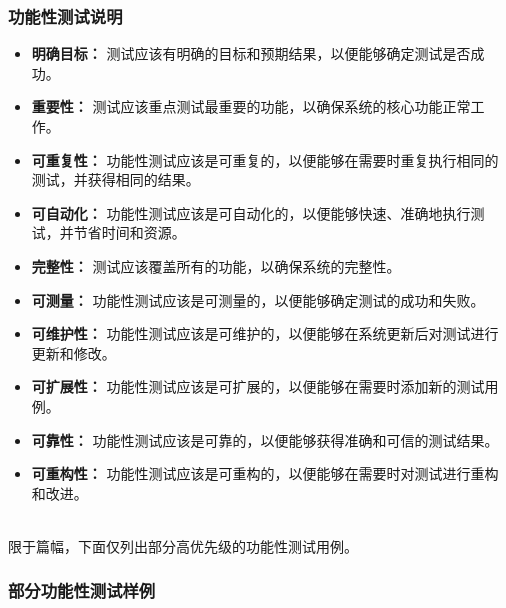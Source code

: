 \subsubsection{功能性测试说明}
\begin{itemize}[itemsep=2pt,topsep=0pt,parsep=4pt,itemindent=1em]
 \item \textbf{明确目标：} 测试应该有明确的目标和预期结果，以便能够确定测试是否成功。

\item \textbf{重要性：} 测试应该重点测试最重要的功能，以确保系统的核心功能正常工作。

\item \textbf{可重复性：} 功能性测试应该是可重复的，以便能够在需要时重复执行相同的测试，并获得相同的结果。

\item \textbf{可自动化：} 功能性测试应该是可自动化的，以便能够快速、准确地执行测试，并节省时间和资源。

\item \textbf{完整性：} 测试应该覆盖所有的功能，以确保系统的完整性。

\item \textbf{可测量：} 功能性测试应该是可测量的，以便能够确定测试的成功和失败。

\item \textbf{可维护性：} 功能性测试应该是可维护的，以便能够在系统更新后对测试进行更新和修改。

\item \textbf{可扩展性：} 功能性测试应该是可扩展的，以便能够在需要时添加新的测试用例。

\item \textbf{可靠性：} 功能性测试应该是可靠的，以便能够获得准确和可信的测试结果。

\item \textbf{可重构性：} 功能性测试应该是可重构的，以便能够在需要时对测试进行重构和改进。
\end{itemize}\\

限于篇幅，下面仅列出部分高优先级的功能性测试用例。

\subsubsection{部分功能性测试样例}

